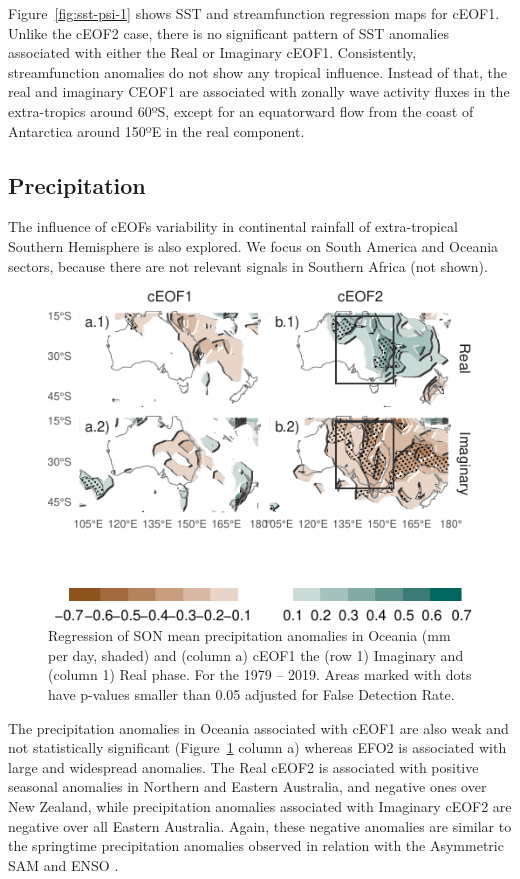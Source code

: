 \documentclass[smallextended]{svjour3}       %
\begin{document}
Figure~\ref{fig:sst-psi-1} shows SST and streamfunction regression maps for cEOF1.
Unlike the cEOF2 case, there is no significant pattern of SST anomalies associated with either the Real or Imaginary cEOF1.
Consistently, streamfunction anomalies do not show any tropical influence.
Instead of that, the real and imaginary CEOF1 are associated with zonally wave activity fluxes in the extra-tropics around 60ºS, except for an equatorward flow from the coast of Antarctica around 150ºE in the real component.

\hypertarget{precipitation}{%
\subsection{Precipitation}\label{precipitation}}

The influence of cEOFs variability in continental rainfall of extra-tropical Southern Hemisphere is also explored.
We focus on South America and Oceania sectors, because there are not relevant signals in Southern Africa (not shown).




\begin{figure}
\centering
\includegraphics{../figures/pp-oceania-1.pdf}
\caption{\label{fig:pp-oceania}Regression of SON mean precipitation anomalies in Oceania (mm per day, shaded) and (column a) cEOF1 the (row 1) Imaginary and (column 1) Real phase. For the 1979 -- 2019.
Areas marked with dots have p-values smaller than 0.05 adjusted for False Detection Rate.}
\end{figure}

The precipitation anomalies in Oceania associated with cEOF1 are also weak and not statistically significant (Figure~\ref{fig:pp-oceania} column a) whereas EFO2 is associated with large and widespread anomalies. The Real cEOF2 is associated with positive seasonal anomalies in Northern and Eastern Australia, and negative ones over New Zealand, while precipitation anomalies associated with Imaginary cEOF2 are negative over all Eastern Australia. Again, these negative anomalies are similar to the springtime precipitation anomalies observed in relation with the Asymmetric SAM \citep{campitelli2021} and ENSO \citep{cai2011}.
\end{document}
